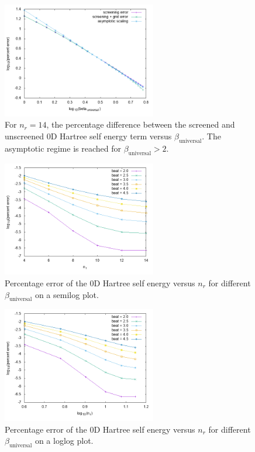 \documentclass[paper=a4, fontsize=11pt]{article} %
\numberwithin{equation}{section} %
\numberwithin{figure}{section} %
\numberwithin{table}{section} %
\begin{document}
\begin{figure}[!htbp] 
    \centering
    \includegraphics[width=0.6\textwidth]{diffbeta}
    \caption{For $n_r = 14$, the percentage difference between the screened and unscreened 0D Hartree self energy term versus $\beta_{\mathrm{universal}}$. The asymptotic regime is reached for $\beta_{\mathrm{universal}} > 2$.} 
    \label{fig:diffbeta}
\end{figure}

\begin{figure}[!htbp] 
    \centering
    \includegraphics[width=0.6\textwidth]{betaconv}
    \caption{Percentage error of the 0D Hartree self energy versus $n_r$ for different $\beta_{\mathrm{universal}}$ on a semilog plot.} 
    \label{fig:diffbeta}
\end{figure}

\begin{figure}[!htbp] 
    \centering
    \includegraphics[width=0.6\textwidth]{betaconvloglog}
    \caption{Percentage error of the 0D Hartree self energy versus $n_r$ for different $\beta_{\mathrm{universal}}$ on a loglog plot.} 
    \label{fig:diffbeta}
\end{figure}
\end{document}
